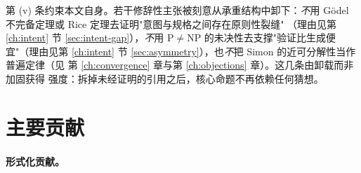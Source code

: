 第 (v) 条约束本文自身。若干修辞性主张被刻意从承重结构中卸下：\emph{不}用 Gödel
不完备定理或 Rice 定理去证明"意图与规格之间存在原则性裂缝"
（理由见第 \ref{ch:intent} 节 \ref{sec:intent-gap}），\emph{不}用 $\mathrm{P}\neq
\mathrm{NP}$ 的未决性去支撑"验证比生成便宜"（理由见第 \ref{ch:intent} 节
\ref{sec:asymmetry}），也\emph{不}把 Simon 的近可分解性当作普遍定律（见
第 \ref{ch:convergence} 章与第 \ref{ch:objections} 章）。这几条由卸载而非加固获得
强度：拆掉未经证明的引用之后，核心命题不再依赖任何猜想。

\section{主要贡献}

\paragraph{形式化贡献。}

